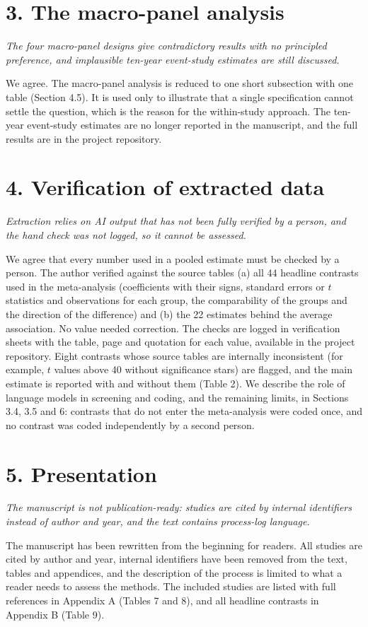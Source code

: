 \documentclass[11pt,a4paper]{article}
\newenvironment{comment}{\par\medskip\noindent\begin{minipage}{\textwidth}\itshape}{\end{minipage}\par\smallskip}
\begin{document}
\section*{3. The macro-panel analysis}
\begin{comment}
The four macro-panel designs give contradictory results with no principled preference, and implausible ten-year event-study estimates are still discussed.
\end{comment}
We agree. The macro-panel analysis is reduced to one short subsection with one table (Section 4.5). It is used only to illustrate that a single specification cannot settle the question, which is the reason for the within-study approach. The ten-year event-study estimates are no longer reported in the manuscript, and the full results are in the project repository.

\section*{4. Verification of extracted data}
\begin{comment}
Extraction relies on AI output that has not been fully verified by a person, and the hand check was not logged, so it cannot be assessed.
\end{comment}
We agree that every number used in a pooled estimate must be checked by a person. The author verified against the source tables (a) all 44 headline contrasts used in the meta-analysis (coefficients with their signs, standard errors or $t$ statistics and observations for each group, the comparability of the groups and the direction of the difference) and (b) the 22 estimates behind the average association. No value needed correction. The checks are logged in verification sheets with the table, page and quotation for each value, available in the project repository. Eight contrasts whose source tables are internally inconsistent (for example, $t$ values above 40 without significance stars) are flagged, and the main estimate is reported with and without them (Table 2). We describe the role of language models in screening and coding, and the remaining limits, in Sections 3.4, 3.5 and 6: contrasts that do not enter the meta-analysis were coded once, and no contrast was coded independently by a second person.

\section*{5. Presentation}
\begin{comment}
The manuscript is not publication-ready: studies are cited by internal identifiers instead of author and year, and the text contains process-log language.
\end{comment}
The manuscript has been rewritten from the beginning for readers. All studies are cited by author and year, internal identifiers have been removed from the text, tables and appendices, and the description of the process is limited to what a reader needs to assess the methods. The included studies are listed with full references in Appendix A (Tables 7 and 8), and all headline contrasts in Appendix B (Table 9).
\end{document}
